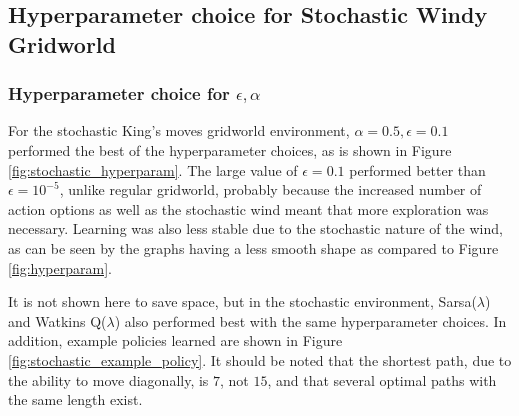 \documentclass{article}
\begin{document}
\subsection{Hyperparameter choice for Stochastic Windy Gridworld}

\subsubsection{Hyperparameter choice for $\epsilon, \alpha$}

For the stochastic King's moves gridworld environment, $\alpha = 0.5, \epsilon = 0.1$ performed the best of the hyperparameter choices, as is shown in Figure \ref{fig:stochastic_hyperparam}. The large value of $\epsilon = 0.1$ performed better than $\epsilon = 10^{-5}$, unlike regular gridworld, probably because the increased number of action options as well as the stochastic wind meant that more exploration was necessary. Learning was also less stable due to the stochastic nature of the wind, as can be seen by the graphs having a less smooth shape as compared to Figure \ref{fig:hyperparam}.

It is not shown here to save space, but in the stochastic environment, Sarsa($\lambda$) and Watkins Q($\lambda$) also performed best with the same hyperparameter choices. In addition, example policies learned are shown in Figure \ref{fig:stochastic_example_policy}. It should be noted that the shortest path, due to the ability to move diagonally, is $7$, not $15$, and that several optimal paths with the same length exist.
\end{document}

